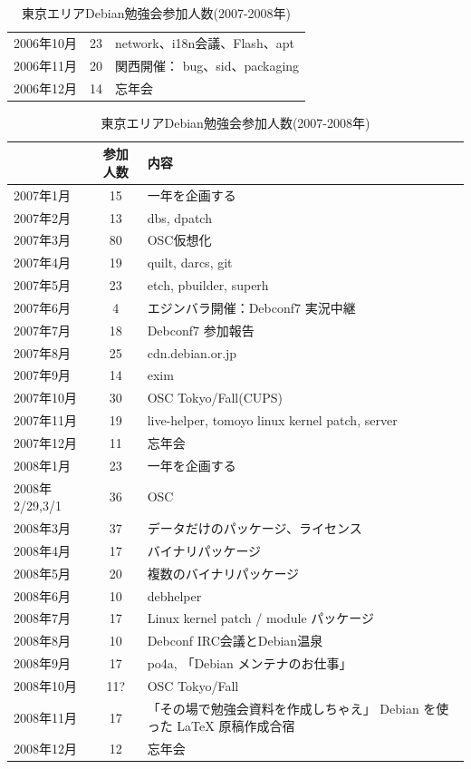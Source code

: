 \documentclass[mingoth,a4paper]{jsarticle}
\begin{document}
\begin{table}[H]
\begin{minipage}{0.5\hsize}
\begin{center}
\begin{tabular}{|l|c|p{10em}|}
   2006年10月 & 23 & network、i18n会議、Flash、apt \\
   2006年11月 & 20 & 関西開催： bug、sid、packaging \\
   2006年12月 & 14 & 忘年会 \\
 \hline
  \end{tabular}
 \end{center}
\end{minipage}
\begin{minipage}{0.5\hsize}
 \caption{東京エリアDebian勉強会参加人数(2007-2008年)}\label{tab:count2007}
 \begin{center}
  \begin{tabular}{|l|c|p{10em}|}
 \hline
 & 参加人数 & 内容\\
 \hline
   2007年1月 & 15 & 一年を企画する \\
   2007年2月 & 13 & dbs, dpatch\\
   2007年3月 & 80 & OSC仮想化 \\
   2007年4月 & 19 & quilt, darcs, git\\
   2007年5月 & 23 & etch, pbuilder, superh \\
   2007年6月 & 4 & エジンバラ開催：Debconf7 実況中継 \\
   2007年7月 & 18 & Debconf7 参加報告\\
   2007年8月 & 25 & cdn.debian.or.jp \\
   2007年9月 & 14 & exim \\
   2007年10月 & 30 & OSC Tokyo/Fall(CUPS) \\
   2007年11月 & 19 & live-helper, tomoyo linux kernel patch, server\\
   2007年12月 & 11 & 忘年会\\
   2008年1月 & 23 & 一年を企画する \\
   2008年2/29,3/1 & 36 & OSC  \\
   2008年3月 & 37 & データだけのパッケージ、ライセンス \\
   2008年4月 & 17 & バイナリパッケージ \\
   2008年5月 & 20 & 複数のバイナリパッケージ \\
   2008年6月 & 10 & debhelper \\
   2008年7月 & 17 & Linux kernel patch / module パッケージ \\
   2008年8月 & 10 & Debconf IRC会議とDebian温泉 \\
   2008年9月 & 17 & po4a, 「Debian メンテナのお仕事」 \\
   2008年10月 & 11? & OSC Tokyo/Fall \\
   2008年11月 & 17 & 「その場で勉強会資料を作成しちゃえ」 Debian を使った \LaTeX{} 原稿作成合宿 \\
   2008年12月 & 12 & 忘年会 \\
 \hline
  \end{tabular}
 \end{center}
\end{minipage}
\end{table}
\end{document}
